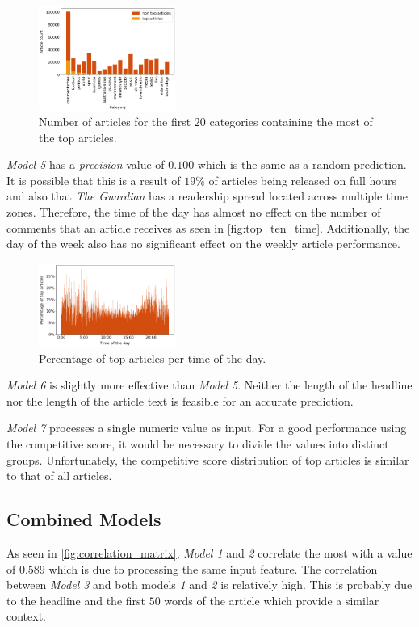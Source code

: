\begin{figure}[h]
	\includegraphics[width=0.4\textwidth]{fig/top_ten_category.png}
	\caption{\textmd{Number of articles for the first $20$ categories containing the most of the top articles.}}
	\label{fig:top_ten_category}
\end{figure}

\textit{Model 5} has a \textit{precision} value of $0.100$ which is the same as a random prediction.
It is possible that this is a result of $19\%$ of articles being released on full hours and also that \textit{The Guardian} has a readership spread located across multiple time zones.
Therefore, the time of the day has almost no effect on the number of comments that an article receives as seen in \autoref{fig:top_ten_time}. 
Additionally, the day of the week also has no significant effect on the weekly article performance. 

\begin{figure}[h]
	\includegraphics[width=0.4\textwidth]{fig/top_ten_time.png}
	\caption{\textmd{Percentage of top articles per time of the day.}}
	\label{fig:top_ten_time}
\end{figure}

\textit{Model 6} is slightly more effective than \textit{Model 5}. 
Neither the length of the headline nor the length of the article text is feasible for an accurate prediction.

\textit{Model 7} processes a single numeric value as input. 
For a good performance using the competitive score, it would be necessary to divide the values into distinct groups.
Unfortunately, the competitive score distribution of top articles is similar to that of all articles.

\subsection{Combined Models}
As seen in \autoref{fig:correlation_matrix}, \textit{Model 1} and \textit{2} correlate the most with a value of $0.589$ which is due to processing the same input feature.
The correlation between \textit{Model 3} and both models \textit{1} and \textit{2} is relatively high. 
This is probably due to the headline and the first $50$ words of the article which provide a similar context.

